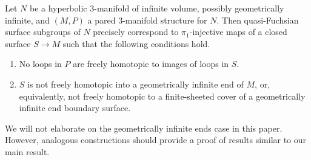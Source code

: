\begin{prop}

Let $N$ be a hyperbolic $3$-manifold of infinite volume, possibly geometrically
infinite, and $(M,P)$ a pared $3$-manifold structure for $N$. Then
quasi-Fuchsian surface subgroups of $N$ precisely correspond to
$\pi_1$-injective maps of a closed surface $S \to M$ such that the following
conditions hold.

\begin{enumerate}

\item No loops in $P$ are freely homotopic to images of loops in $S$.

\item $S$ is not freely homotopic into a geometrically infinite end of $M$, or,
equivalently, not freely homotopic to a finite-sheeted cover of a geometrically
infinite end boundary surface.

\end{enumerate}

\end{prop}

We will not elaborate on the geometrically infinite ends case in this paper.
However, analogous constructions should provide a proof of results similar to
our main result.

